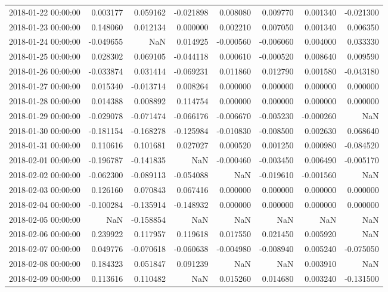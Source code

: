 \begin{tabular}{lrrrrrrr}
2018-01-22 00:00:00 & 0.003177 & 0.059162 & -0.021898 & 0.008080 & 0.009770 & 0.001340 & -0.021300 \\
2018-01-23 00:00:00 & 0.148060 & 0.012134 & 0.000000 & 0.002210 & 0.007050 & 0.001340 & 0.006350 \\
2018-01-24 00:00:00 & -0.049655 & NaN & 0.014925 & -0.000560 & -0.006060 & 0.004000 & 0.033330 \\
2018-01-25 00:00:00 & 0.028302 & 0.069105 & -0.044118 & 0.000610 & -0.000520 & 0.008640 & 0.009590 \\
2018-01-26 00:00:00 & -0.033874 & 0.031414 & -0.069231 & 0.011860 & 0.012790 & 0.001580 & -0.043180 \\
2018-01-27 00:00:00 & 0.015340 & -0.013714 & 0.008264 & 0.000000 & 0.000000 & 0.000000 & 0.000000 \\
2018-01-28 00:00:00 & 0.014388 & 0.008892 & 0.114754 & 0.000000 & 0.000000 & 0.000000 & 0.000000 \\
2018-01-29 00:00:00 & -0.029078 & -0.071474 & -0.066176 & -0.006670 & -0.005230 & -0.000260 & NaN \\
2018-01-30 00:00:00 & -0.181154 & -0.168278 & -0.125984 & -0.010830 & -0.008500 & 0.002630 & 0.068640 \\
2018-01-31 00:00:00 & 0.110616 & 0.101681 & 0.027027 & 0.000520 & 0.001250 & 0.000980 & -0.084520 \\
2018-02-01 00:00:00 & -0.196787 & -0.141835 & NaN & -0.000460 & -0.003450 & 0.006490 & -0.005170 \\
2018-02-02 00:00:00 & -0.062300 & -0.089113 & -0.054088 & NaN & -0.019610 & -0.001560 & NaN \\
2018-02-03 00:00:00 & 0.126160 & 0.070843 & 0.067416 & 0.000000 & 0.000000 & 0.000000 & 0.000000 \\
2018-02-04 00:00:00 & -0.100284 & -0.135914 & -0.148932 & 0.000000 & 0.000000 & 0.000000 & 0.000000 \\
2018-02-05 00:00:00 & NaN & -0.158854 & NaN & NaN & NaN & NaN & NaN \\
2018-02-06 00:00:00 & 0.239922 & 0.117957 & 0.119618 & 0.017550 & 0.021450 & 0.005920 & NaN \\
2018-02-07 00:00:00 & 0.049776 & -0.070618 & -0.060638 & -0.004980 & -0.008940 & 0.005240 & -0.075050 \\
2018-02-08 00:00:00 & 0.184323 & 0.051847 & 0.091239 & NaN & NaN & 0.003910 & NaN \\
2018-02-09 00:00:00 & 0.113616 & 0.110482 & NaN & 0.015260 & 0.014680 & 0.003240 & -0.131500 \\

\end{tabular}
